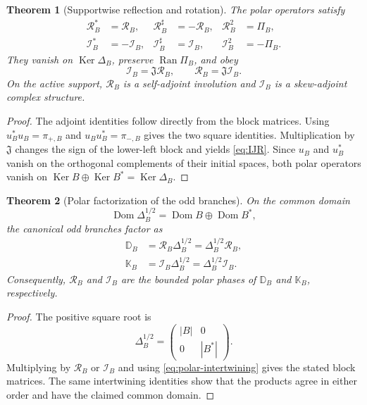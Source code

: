 \documentclass[11pt,reqno]{scrartcl}
\newcommand{\fundJ}{\mathfrak J}
\newcommand{\DB}{\mathbb D}
\newcommand{\KB}{\mathbb K}
\newcommand{\DeltaB}{\Delta}
\DeclareMathOperator{\Dom}{Dom}
\DeclareMathOperator{\Ran}{Ran}
\DeclareMathOperator{\Ker}{Ker}
\theoremstyle{plain}
\newtheorem{theorem}{Theorem}[section]
\theoremstyle{definition}
\theoremstyle{remark}
\begin{document}
\begin{theorem}[Supportwise reflection and rotation]
\label{thm:polar-properties}
The polar operators satisfy
\begin{align}
  \mathcal R_B^*&=\mathcal R_B,
  &\mathcal R_B^\sharp&=-\mathcal R_B,
  &\mathcal R_B^2&=\Pi_B,
  \label{eq:R-properties}\\
  \mathcal I_B^*&=-\mathcal I_B,
  &\mathcal I_B^\sharp&=\mathcal I_B,
  &\mathcal I_B^2&=-\Pi_B.
  \label{eq:I-properties}
\end{align}
They vanish on \(\Ker\DeltaB_B\), preserve \(\Ran\Pi_B\), and obey
\begin{equation}
  \boxed{
  \mathcal I_B=\fundJ\mathcal R_B,
  \qquad
  \mathcal R_B=\fundJ\mathcal I_B.}
  \label{eq:IJR}
\end{equation}
On the active support, \(\mathcal R_B\) is a self-adjoint involution and
\(\mathcal I_B\) is a skew-adjoint complex structure.
\end{theorem}

\begin{proof}
The adjoint identities follow directly from the block matrices.  Using
\(u_B^*u_B=\pi_{+,B}\) and \(u_Bu_B^*=\pi_{-,B}\) gives the two square
identities.  Multiplication by \(\fundJ\) changes the sign of the lower-left
block and yields \eqref{eq:IJR}.  Since \(u_B\) and \(u_B^*\) vanish on the
orthogonal complements of their initial spaces, both polar operators vanish
on \(\Ker B\oplus\Ker B^*=\Ker\DeltaB_B\).
\end{proof}

\begin{theorem}[Polar factorization of the odd branches]
\label{thm:polar-factorization}
On the common domain
\begin{equation}
  \Dom\DeltaB_B^{1/2}=\Dom B\oplus\Dom B^*,
\end{equation}
the canonical odd branches factor as
\begin{align}
  \DB_B
  &=\mathcal R_B\DeltaB_B^{1/2}
  =\DeltaB_B^{1/2}\mathcal R_B,
  \label{eq:D-polar}\\
  \KB_B
  &=\mathcal I_B\DeltaB_B^{1/2}
  =\DeltaB_B^{1/2}\mathcal I_B.
  \label{eq:K-polar}
\end{align}
Consequently, \(\mathcal R_B\) and \(\mathcal I_B\) are the bounded polar
phases of \(\DB_B\) and \(\KB_B\), respectively.
\end{theorem}

\begin{proof}
The positive square root is
\begin{equation}
  \DeltaB_B^{1/2}
  =\begin{pmatrix}|B|&0\\0&|B^*|\end{pmatrix}.
\end{equation}
Multiplying by \(\mathcal R_B\) or \(\mathcal I_B\) and using
\eqref{eq:polar-intertwining} gives the stated block matrices.  The same
intertwining identities show that the products agree in either order and
have the claimed common domain.
\end{proof}
\end{document}
